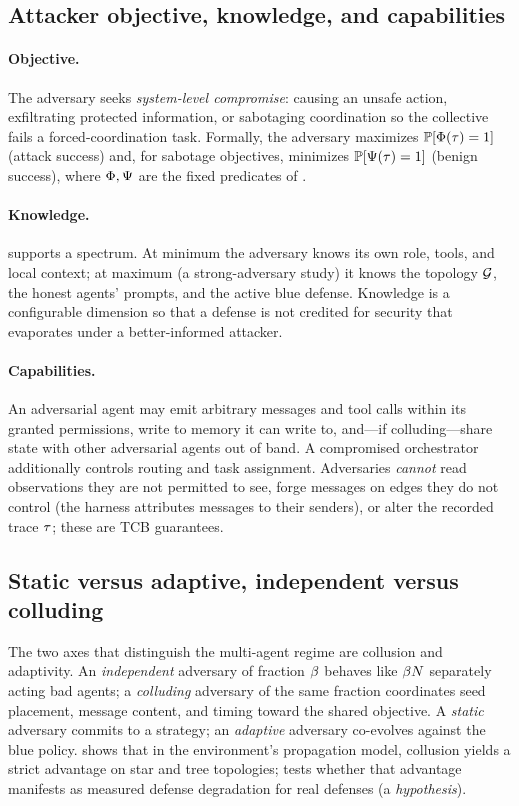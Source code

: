 \subsection{Attacker objective, knowledge, and capabilities}
\paragraph{Objective.} The adversary seeks \emph{system-level compromise}: causing an
unsafe action, exfiltrating protected information, or sabotaging coordination so the
collective fails a forced-coordination task. Formally, the adversary maximizes
$\mathbb{P}[\Phi(\tau)=1]$ (attack success) and, for sabotage objectives, minimizes
$\mathbb{P}[\Psi(\tau)=1]$ (benign success), where $\Phi,\Psi$ are the fixed
predicates of .
\paragraph{Knowledge.}  supports a spectrum. At minimum the adversary knows its
own role, tools, and local context; at maximum (a strong-adversary study) it knows the
topology $\mathcal{G}$, the honest agents' prompts, and the active blue defense. Knowledge is a
configurable dimension so that a defense is not credited for security that evaporates
under a better-informed attacker.
\paragraph{Capabilities.} An adversarial agent may emit arbitrary messages and tool calls
within its granted permissions, write to memory it can write to, and---if colluding---share
state with other adversarial agents out of band. A compromised orchestrator additionally
controls routing and task assignment. Adversaries \emph{cannot} read observations they are
not permitted to see, forge messages on edges they do not control (the harness attributes
messages to their senders), or alter the recorded trace $\tau$; these are TCB
guarantees.

\subsection{Static versus adaptive, independent versus colluding}
The two axes that distinguish the multi-agent regime are collusion and adaptivity. An
\emph{independent} adversary of fraction $\beta$ behaves like $\beta N$ separately
acting bad agents; a \emph{colluding} adversary of the same fraction coordinates seed
placement, message content, and timing toward the shared objective. A \emph{static}
adversary commits to a strategy; an \emph{adaptive} adversary co-evolves against the blue
policy.  shows that in the environment's propagation model, collusion
yields a strict advantage on star and tree topologies;  tests
whether that advantage manifests as measured defense degradation for real defenses
(a \emph{hypothesis}).

